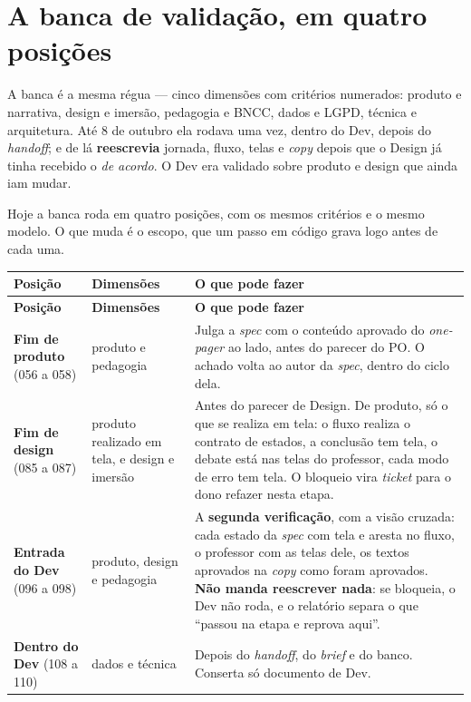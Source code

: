 \documentclass[11pt,a4paper]{article}
\begin{document}
\section{A banca de validação, em quatro posições}
\label{sec:banca}

A banca é a mesma régua --- cinco dimensões com critérios numerados: produto e narrativa, design e imersão, pedagogia e BNCC, dados e LGPD, técnica e arquitetura. Até 8 de outubro ela rodava uma vez, dentro do Dev, depois do \emph{handoff}; e de lá \textbf{reescrevia} jornada, fluxo, telas e \emph{copy} depois que o Design já tinha recebido o \emph{de acordo}. O Dev era validado sobre produto e design que ainda iam mudar.

Hoje a banca roda em quatro posições, com os mesmos critérios e o mesmo modelo. O que muda é o escopo, que um passo em código grava logo antes de cada uma.

\begin{center}
\begin{longtable}{>{\raggedright\arraybackslash}p{2.6cm}>{\raggedright\arraybackslash}p{2.6cm}p{9.4cm}}
\toprule
\sffamily\bfseries\footnotesize\color{unNavy}Posição & \sffamily\bfseries\footnotesize\color{unNavy}Dimensões & \sffamily\bfseries\footnotesize\color{unNavy}O que pode fazer \\
\midrule
\endfirsthead
\toprule
\sffamily\bfseries\footnotesize\color{unNavy}Posição & \sffamily\bfseries\footnotesize\color{unNavy}Dimensões & \sffamily\bfseries\footnotesize\color{unNavy}O que pode fazer \\
\midrule
\endhead
\footnotesize\textbf{Fim de produto} (056 a 058) & \footnotesize produto e pedagogia & \footnotesize Julga a \emph{spec} com o conteúdo aprovado do \emph{one-pager} ao lado, antes do parecer do PO. O achado volta ao autor da \emph{spec}, dentro do ciclo dela. \\
\addlinespace
\footnotesize\textbf{Fim de design} (085 a 087) & \footnotesize produto realizado em tela, e design e imersão & \footnotesize Antes do parecer de Design. De produto, só o que se realiza em tela: o fluxo realiza o contrato de estados, a conclusão tem tela, o debate está nas telas do professor, cada modo de erro tem tela. O bloqueio vira \emph{ticket} para o dono refazer nesta etapa. \\
\addlinespace
\footnotesize\textbf{Entrada do Dev} (096 a 098) & \footnotesize produto, design e pedagogia & \footnotesize A \textbf{segunda verificação}, com a visão cruzada: cada estado da \emph{spec} com tela e aresta no fluxo, o professor com as telas dele, os textos aprovados na \emph{copy} como foram aprovados. \textbf{Não manda reescrever nada}: se bloqueia, o Dev não roda, e o relatório separa o que ``passou na etapa e reprova aqui''. \\
\addlinespace
\footnotesize\textbf{Dentro do Dev} (108 a 110) & \footnotesize dados e técnica & \footnotesize Depois do \emph{handoff}, do \emph{brief} e do banco. Conserta só documento de Dev. \\
\bottomrule
\end{longtable}
\end{center}
\end{document}
